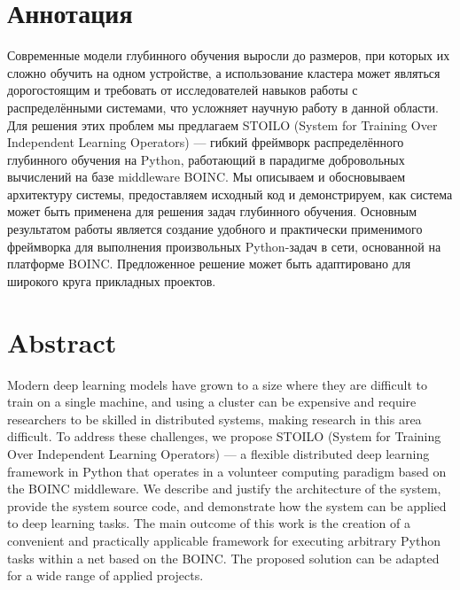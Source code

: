 \documentclass[a4paper,12pt]{extarticle}
\begin{document}

\newpage
\setcounter{page}{2}

{
	\hypersetup{linkcolor=black}
	\tableofcontents
}

\newpage

\section*{Аннотация}

Современные модели глубинного обучения выросли до размеров, при которых их сложно обучить на одном устройстве, а использование кластера может являться дорогостоящим и требовать от исследователей навыков работы с распределёнными системами, что усложняет научную работу в данной области. Для решения этих проблем мы предлагаем STOILO (System for Training Over Independent Learning Operators) — гибкий фреймворк распределённого глубинного обучения на Python, работающий в парадигме добровольных вычислений на базе middleware BOINC. Мы описываем и обосновываем архитектуру системы, предоставляем исходный код и демонстрируем, как система может быть применена для решения задач глубинного обучения. Основным результатом работы является создание удобного и практически применимого фреймворка для выполнения произвольных Python-задач в сети, основанной на платформе BOINC. Предложенное решение может быть адаптировано для широкого круга прикладных проектов.

\section*{Abstract}

Modern deep learning models have grown to a size where they are difficult to train on a single machine, and using a cluster can be expensive and require researchers to be skilled in distributed systems, making research in this area difficult. To address these challenges, we propose STOILO (System for Training Over Independent Learning Operators) — a flexible distributed deep learning framework in Python that operates in a volunteer computing paradigm based on the BOINC middleware. We describe and justify the architecture of the system, provide the system source code, and demonstrate how the system can be applied to deep learning tasks. The main outcome of this work is the creation of a convenient and practically applicable framework for executing arbitrary Python tasks within a net based on the BOINC. The proposed solution can be adapted for a wide range of applied projects.
\end{document}
